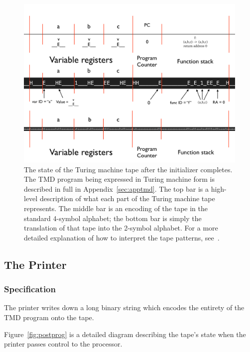 \documentclass[11pt]{article}
\begin{document}
\begin{figure} 
\begin{center} 
\includegraphics[scale=0.42]{figs/postinit.png}
\caption{The state of the Turing machine tape after the initializer completes. The TMD program being expressed in Turing machine form is described in full in Appendix~\ref{sec:apptmd}. The top bar is a high-level description of what each part of the Turing machine tape represents. The middle bar is an encoding of the tape in the standard 4-symbol alphabet; the bottom bar is simply the translation of that tape into the 2-symbol alphabet. For a more detailed explanation of how to interpret the tape patterns, see~\cite{github}. \label{fig:postinit}} 
\end{center} 
\end{figure}

\subsection{The Printer} \label{sec:introspect}

\subsubsection{Specification}

The printer writes down a long binary string which encodes the entirety of the TMD program onto the tape.

Figure~\ref{fig:postprog} is a detailed diagram describing the tape's state when the printer passes control to the processor.
\end{document}
